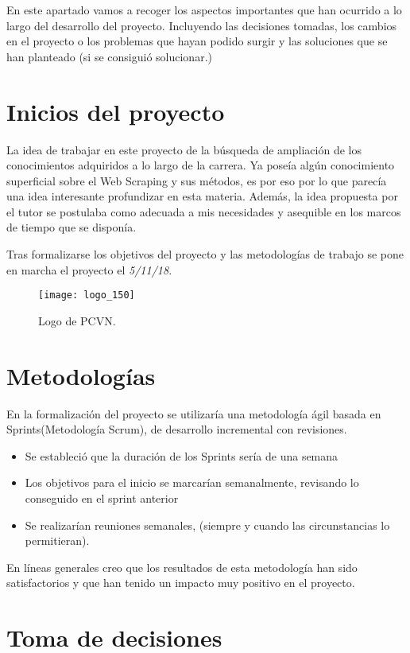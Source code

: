 
En este apartado vamos a recoger los aspectos importantes que han ocurrido a lo largo del desarrollo del proyecto. Incluyendo las decisiones tomadas, los cambios en el proyecto o los problemas que hayan podido surgir y las soluciones que se han planteado (si se consiguió solucionar.)

\section{Inicios del proyecto}
La idea de trabajar en este proyecto de la búsqueda de ampliación de los conocimientos adquiridos a lo largo de la carrera. Ya poseía algún conocimiento superficial sobre el Web Scraping y sus métodos, es por eso por lo que parecía una idea interesante profundizar en esta materia. Además, la idea propuesta por el tutor se postulaba como adecuada a mis necesidades y asequible en los marcos de tiempo que se disponía.

Tras formalizarse los objetivos del proyecto y las metodologías de trabajo se pone en marcha el proyecto el \emph{5/11/18}.

\begin{figure}[H]
	\centering
	\texttt{[image: logo\_150]}
	\caption{Logo de PCVN.}
	\label{fig:logo}
\end{figure}


\section{Metodologías}
En la formalización del proyecto se utilizaría una metodología ágil basada en Sprints(Metodología Scrum), de desarrollo incremental con revisiones.
\begin{itemize}
	\item	Se estableció que la duración de los Sprints sería de una semana
	\item	Los objetivos para el inicio se marcarían semanalmente, revisando lo conseguido en el sprint anterior
	\item	Se realizarían reuniones semanales, (siempre y cuando las circunstancias lo permitieran).
\end{itemize}

En líneas generales creo que los resultados de esta metodología han sido satisfactorios y que han tenido un impacto muy positivo en el proyecto.

\section{Toma de decisiones}
